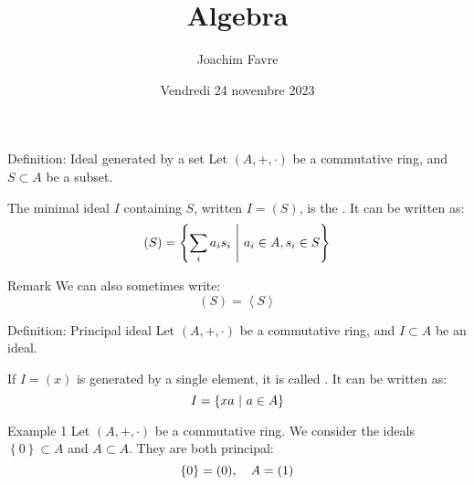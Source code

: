 \documentclass[a4paper]{article}
\title{Algebra}
\author{Joachim Favre}
\date{Vendredi 24 novembre 2023}
\begin{document}
\maketitle



\begin{parag}{Definition: Ideal generated by a set}
    Let $\left(A, +,\cdot \right)$ be a commutative ring, and $S \subset A$ be a subset.

    The minimal ideal $I$ containing $S$, written $I =\left(S\right)$, is the . It can be written as: 
    \[\left(S\right) = \left\{\sum_{i}^{} a_i s_i \suchthat a_i \in A, s_i \in S\right\}\]

    \begin{subparag}{Remark}
        We can also sometimes write: 
        \[\left(S\right) = \left\langle S \right\rangle\]
    \end{subparag}
\end{parag}

\begin{parag}{Definition: Principal ideal}
    Let $\left(A, +, \cdot \right)$ be a commutative ring, and $I \subset A$ be an ideal.

    If $I = \left(x\right)$ is generated by a single element, it is called . It can be written as: 
    \[I = \left\{xa \suchthat a \in A\right\}\]
\end{parag}

\begin{parag}{Example 1}
    Let $\left(A, +, \cdot \right)$ be a commutative ring. We consider the ideals $\left\{0\right\} \subset A$ and $A \subset A$. They are both principal:
    \[\left\{0\right\} = \left(0\right), \mathspace A = \left(1\right)\]
\end{parag}
\end{document}
